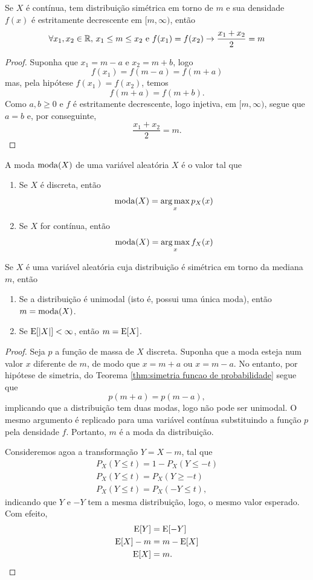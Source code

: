 \begin{cor:simetria e media aritmetica}
Se $X$ é contínua, tem distribuição simétrica em torno de $m$ e sua densidade $f(x)$ é
estritamente decrescente em $[m, \infty)$, então
\[
    \forall x_1, x_2 \in \mathbb{R},\, x_1 \le m \le x_2 \text{ e } f(x_1) = f(x_2) \rightarrow \frac{x_1 + x_2}{2} = m
\]
\end{cor:simetria e media aritmetica}
\begin{proof}
Suponha que $x_1 = m - a$ e $x_2 = m + b$, logo
\[
    f(x_1) = f(m-a) = f(m+a)
\]
mas, pela hipótese $f(x_1) = f(x_2)$, temos
\[
    f(m+a) = f(m+b).
\]
Como $a, b \ge 0$ e $f$ é estritamente decrescente, logo injetiva, em $[m, \infty)$,
segue que $a = b$ e, por conseguinte,
\[
    \frac{x_1 + x_2}{2}  = m.
\]
\end{proof}

\begin{def:moda}
\label{def:moda}
A moda $\mathrm{moda}\!\left(X\right)$ de uma variável aleatória $X$ é o valor tal que
\begin{enumerate}
\item Se $X$ é discreta, então
\[
    \mathrm{moda}\!\left(X\right) = \operatorname*{arg\,max}_x p_X(x)
\]
\item Se $X$ for contínua, então
\[
    \mathrm{moda}\!\left(X\right) = \operatorname*{arg\,max}_x f_X(x)
\]
\end{enumerate}
\end{def:moda}

\begin{thm:simetria media moda mediana}
Se $X$ é uma variável aleatória cuja distribuição é simétrica em torno da mediana $m$,
então
\begin{enumerate}
\item Se a distribuição é unimodal (isto é, possui uma única moda), então $m = \mathrm{moda}\!\left(X\right)$.
\item Se $\mathrm{E}\!\left[|X|\right] < \infty$, então $m = \mathrm{E}\!\left[X\right]$.
\end{enumerate}
\end{thm:simetria media moda mediana}
\begin{proof}
Seja $p$ a função de massa de $X$ discreta.
Suponha que a moda esteja num valor $x$ diferente de $m$, de modo que $x = m + a$ ou
$x = m - a$.
No entanto, por hipótese de simetria, do Teorema \ref{thm:simetria funcao de probabilidade}
segue que
\[
    p(m+a) = p(m-a),
\]
implicando que a distribuição tem duas modas, logo não pode ser unimodal.
O mesmo argumento é replicado para uma variável contínua substituindo a função $p$ pela
densidade $f$.
Portanto, $m$ é a moda da distribuição.

Consideremos agoa a transformação $Y = X - m$, tal que
\begin{gather*}
P_X(Y \le t) = 1 - P_X(Y \le -t) \\
P_X(Y \le t) = P_X(Y \ge -t) \\
P_X(Y \le t) = P_X(-Y \le t),
\end{gather*}
indicando que $Y$ e $-Y$ tem a mesma distribuição, logo, o mesmo valor esperado.
Com efeito,
\begin{align*}
    \mathrm{E}\!\left[Y\right] &= \mathrm{E}\!\left[-Y\right] \\
    \mathrm{E}\!\left[X\right] - m &= m - \mathrm{E}\!\left[X\right] \\
    \mathrm{E}\!\left[X\right] &= m.
\end{align*}
\end{proof}
